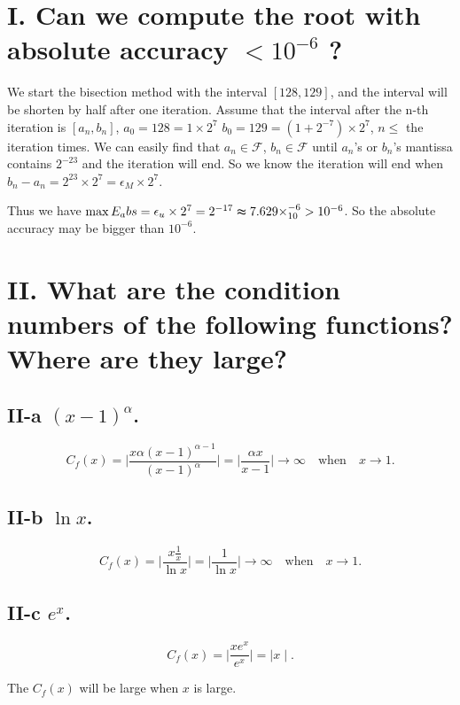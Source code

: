 \documentclass[twoside,a4paper]{article}
\begin{document}
\pagestyle{fancy}
\fancyhead{}


\section*{I. \small{Can we compute the root with absolute accuracy $<10^{-6}$ ?}}
We start the bisection method with the interval $[128,129]$, and the interval will be shorten by half after one iteration.
Assume that the interval after the n-th iteration is $[a_n,b_n]$,  $a_0=128=1\times2^{7}$ $b_0=129=\left( 1+2^{-7} \right)\times2^{7} $, $n\le$ the iteration times.
We can easily find that $a_n\in\mathcal{F}$,  $b_n\in\mathcal{F}$ until $a_n$'s or $b_n$'s mantissa contains $2^{-23}$ and the iteration will end.
So we know the iteration will end when $b_n-a_n=2^{23}\times2^{7}=\epsilon_M\times2^{7}$.  

Thus we have $\max E_abs=\epsilon_u\times2^{7}=2^{-17}\thickapprox 7.629\times_{10}^{-6}>10^{-6}$.
So the absolute accuracy may be bigger than $10^{-6}$.

\section*{II. \small{What are the condition numbers of the following functions?Where are they large?}}

\subsection*{II-a \small{$\left( x-1 \right)^{\alpha} $.}}
\[
	C_f\left( x \right)= \mid \frac{x\alpha\left( x-1 \right)^{\alpha-1} }{\left( x-1 \right)^{\alpha} } \mid
	= \mid \frac{\alpha x}{x-1} \mid 
	\to \infty \quad \mathrm{when} \quad x\to 1
.\] 
\subsection*{II-b \small{$\ln x$.}}
\[
	C_f\left( x \right) = \mid \frac{x \frac{1}{x}}{\ln x} \mid = \mid \frac{1}{\ln x} \mid 
	\to \infty \quad \mathrm{when} \quad x\to 1
.\] 

\subsection*{II-c \small{$e^{x}$.}}
\[
	C_f\left( x \right) = \mid \frac{xe^{x}}{e^{x}} \mid = \mid x \mid
.\] 

The $C_f\left( x \right) $ will be large when $x$ is large.
\end{document}
